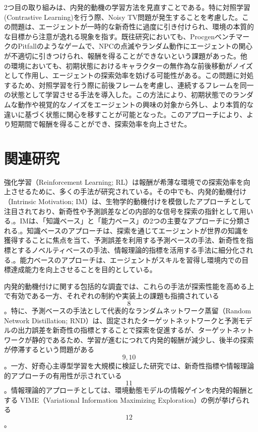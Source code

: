 2つ目の取り組みは、内発的動機の学習方法を見直すことである。特に対照学習(Contrastive Learning)を行う際、Noisy TV問題が発生することを考慮した。この問題は、エージェントが一時的な新奇性に過度に引き付けられ、環境の本質的な目標から注意が逸れる現象を指す。既往研究においても、ProcgenベンチマークのPitfallのようなゲームで、NPCの点滅やランダム動作にエージェントの関心が不適切に引きつけられ、報酬を得ることができないという課題があった。他の環境においても、初期状態におけるキャラクターの無作為な前後移動がノイズとして作用し、エージェントの探索効率を妨げる可能性がある。この問題に対処するため、対照学習を行う際に前後フレームを考慮し、連続するフレームを同一の状態として学習させる手法を導入した。この方法により、初期状態でのランダムな動作や視覚的なノイズをエージェントの興味の対象から外し、より本質的な違いに基づく状態に関心を移すことが可能となった。このアプローチにより、より短期間で報酬を得ることができ、探索効率を向上させた。

\section{関連研究}
強化学習（Reinforcement Learning; RL）は報酬が希薄な環境での探索効率を向上させるために、多くの手法が研究されている。その中でも、内発的動機付け（Intrinsic Motivation; IM）は、生物学的動機付けを模倣したアプローチとして注目されており、新奇性や予測誤差などの内部的な信号を探索の指針として用いる\cite{RL},\cite{IM}。IMは、「知識ベース」と「能力ベース」の2つの主要なアプローチに分類される\cite{IM2},\cite{IM3}。知識ベースのアプローチは、探索を通じてエージェントが世界の知識を獲得することに焦点を当て、予測誤差を利用する予測ベースの手法、新奇性を指標とするノベルティベースの手法、情報理論的指標を活用する手法に細分化される\cite{UCEIM},\cite{IMS}。能力ベースのアプローチは、エージェントがスキルを習得し環境内での目標達成能力を向上させることを目的としている\cite{CDE}。

内発的動機付けに関する包括的な調査では、これらの手法が探索性能を高める上で有効である一方、それぞれの制約や実装上の課題も指摘されている\[8\]。特に、予測ベースの手法として代表的なランダムネットワーク蒸留（Random Network Distillation; RND）は、固定されたターゲットネットワークと予測モデルの出力誤差を新奇性の指標とすることで探索を促進するが、ターゲットネットワークが静的であるため、学習が進むにつれて内発的報酬が減少し、後半の探索が停滞するという問題がある\[9, 10\]。一方、好奇心主導型学習を大規模に検証した研究では、新奇性指標や情報理論的アプローチの有用性が示されている\[11\]。情報理論的アプローチとしては、環境動態モデルの情報ゲインを内発的報酬とする VIME（Variational Information Maximizing Exploration）の例が挙げられる\[12\]。

